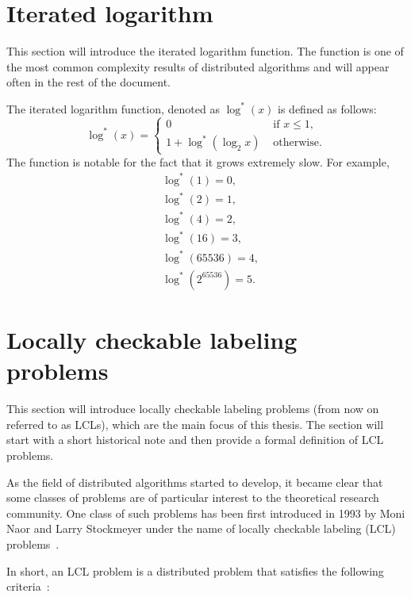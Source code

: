 \section{Iterated logarithm}

This section will introduce the iterated logarithm function. The function is
one of the most common complexity results of distributed algorithms and will
appear often in the rest of the document.

The iterated logarithm function, denoted as $\log^*(x)$ is defined as follows:
\[
    \log^*(x) = \begin{cases}
        0 & \text{ if $x \le 1$}, \\
        1 + \log^*(\log_2 x) & \text{ otherwise}.
    \end{cases}
\]
The function is notable for the fact that it grows extremely slow. For example,
\begin{align*}
  &\log^*(1) = 0, \\
  &\log^*(2) = 1, \\
  &\log^*(4) = 2, \\
  &\log^*(16) = 3, \\
  &\log^*(65536) = 4, \\
  &\log^*(2^{65536}) = 5.
\end{align*}

\section{Locally checkable labeling problems}

This section will introduce locally checkable labeling problems (from now on referred to as
LCLs), which are the main focus of this thesis. The section will start with
a short historical note and then provide a formal definition of
LCL problems.

As the field of distributed algorithms started to develop, it became clear
that some classes of problems
are of particular interest to the theoretical research community.
One class of such problems has been first introduced in 1993 by
Moni Naor and Larry Stockmeyer under the name of locally checkable 
labeling (LCL) problems~\cite{Naor1993}.

In short, an LCL problem is a distributed problem that satisfies the 
following criteria~\cite{Naor1993, Suomela2020}:

